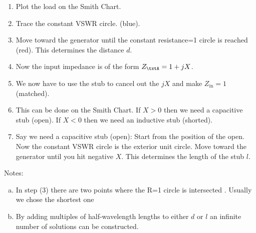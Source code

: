 \begin{enumerate}
\item Plot the load on the Smith Chart.
\item Trace the constant VSWR circle. (blue).
\item Move toward the generator until the constant resistance=1 circle is reached (red).  This determines the distance \(d\).
\item Now the input impedance is of the form \(Z_\txtA = 1 + j X\).
\item We now have to use the stub to cancel out the \( j X \) and make \( Z_{\textrm{in}} = 1 \) (matched).
\item This can be done on the Smith Chart. If \( X>0 \) then we need a capacitive stub (open). If \( X<0 \) then we need an inductive stub (shorted).
\item Say we need a capacitive stub (open): Start from the position of the open. Now the constant VSWR circle is the exterior unit
circle. Move toward the generator until you hit negative \( X \). This determines the length of the stub \( l \).
\end{enumerate}

Notes:
\begin{enumerate}[(a)]
\item In step (3) there are two points where the R=1 circle is intersected . Usually we chose the shortest one
\item By adding multiples of half-wavelength lengths to either \(d\) or \(l\) an infinite number of solutions can be constructed.
\end{enumerate}
